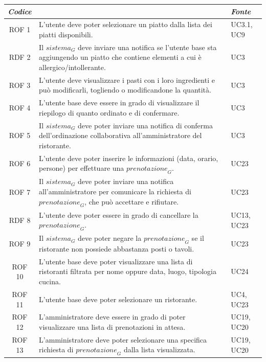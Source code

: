 \documentclass[12pt, oneside]{article}
\begin{document}
\begin{longtable}{|c|p{14cm}|p{2cm}|}
    \hline
    \emph{Codice} & \centering{\emph{Descrizione}} &  \emph{Fonte} \\
    \hline
    \endfirsthead
    \endhead

    ROF 1&  L'utente deve poter selezionare un piatto dalla lista dei piatti disponibili.  & UC3.1, UC9  \\
    \hline
    RDF 2& Il $\textit{sistema}_G$ deve inviare una notifica se l'utente base sta aggiungendo un piatto che contiene elementi a cui è allergico/intollerante. & UC3\\
    \hline
    ROF 3& L'utente deve visualizzare i pasti con i loro ingredienti e può modificarli, togliendo o modificandone la quantità. & UC3\\
    \hline
    ROF 4& L'utente base deve essere in grado di visualizzare il riepilogo di quanto ordinato e di confermare. & UC3 \\
    \hline
    ROF 5& Il $\textit{sistema}_G$ deve poter inviare una notifica di conferma dell’ordinazione collaborativa all’amministratore del ristorante.& UC3 \\
    \hline
    ROF 6& L'utente deve poter inserire le informazioni (data, orario, persone) per effettuare una $\textit{prenotazione}_G$. & UC23\\
    \hline
    ROF 7& Il $\textit{sistema}_G$ deve poter inviare una notifica all’amministratore per comunicare la richiesta di $\textit{prenotazione}_G$, che può accettare e rifiutare. & UC23\\
    \hline
    RDF 8& L'utente deve poter essere in grado di cancellare la $\textit{prenotazione}_G$. & UC13, UC23 \\
    \hline
    ROF 9& Il $\textit{sistema}_G$ deve poter negare la $\textit{prenotazione}_G$ se il ristorante non possiede abbastanza posti o tavoli. & UC23 \\
    \hline
    ROF 10& L'utente base deve poter visualizzare una lista di ristoranti filtrata per nome oppure data, luogo, tipologia cucina. & UC24 \\
    \hline
    ROF 11& L'utente base deve poter selezionare un ristorante.  & UC4, UC23 \\
    \hline
    ROF 12& L'amministratore deve essere in grado di poter visualizzare una lista di prenotazioni in attesa. & UC19, UC20 \\
    \hline
    ROF 13& L'amministratore deve poter selezionare una specifica richiesta di $\textit{prenotazione}_G$ dalla lista visualizzata. & UC19, UC20 \\

\end{longtable}
\end{document}
